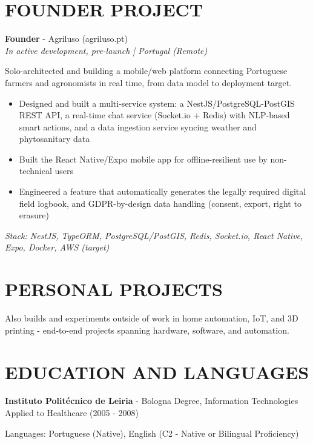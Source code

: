 \documentclass[11pt,a4paper]{article}
\newcommand{\cventry}[4]{%
  \textbf{#1} - #2\\
  {\small\color{subtext}\textit{#3 | #4}}\par\vspace{3pt}
}
\newcommand{\cvintro}[1]{#1\par\vspace{3pt}}
\newenvironment{cvitems}{\begin{itemize}[leftmargin=1.3em,itemsep=3pt,topsep=4pt,parsep=0pt]}{\end{itemize}}
\newcommand{\cvstack}[1]{{\small\color{subtext}\textit{Stack: #1}}\par}
\begin{document}
\section{FOUNDER PROJECT}
\cventry{Founder}{Agriluso (agriluso.pt)}{In active development, pre-launch}{Portugal (Remote)}
\cvintro{Solo-architected and building a mobile/web platform connecting Portuguese farmers and agronomists in real time, from data model to deployment target.}
\begin{cvitems}
  \item Designed and built a multi-service system: a NestJS/PostgreSQL-PostGIS REST API, a real-time chat service (Socket.io + Redis) with NLP-based smart actions, and a data ingestion service syncing weather and phytosanitary data
  \item Built the React Native/Expo mobile app for offline-resilient use by non-technical users
  \item Engineered a feature that automatically generates the legally required digital field logbook, and GDPR-by-design data handling (consent, export, right to erasure)
\end{cvitems}
\cvstack{NestJS, TypeORM, PostgreSQL/PostGIS, Redis, Socket.io, React Native, Expo, Docker, AWS (target)}

\section{PERSONAL PROJECTS}
Also builds and experiments outside of work in home automation, IoT, and 3D printing - end-to-end projects spanning hardware, software, and automation.

\section{EDUCATION AND LANGUAGES}
\textbf{Instituto Politécnico de Leiria} - Bologna Degree, Information Technologies Applied to Healthcare (2005 - 2008)

Languages: Portuguese (Native), English (C2 - Native or Bilingual Proficiency)
\end{document}
